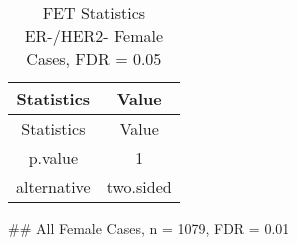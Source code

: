 \documentclass[]{article}
\begin{document}
\begin{longtable}[]{@{}cc@{}}
\caption{FET Statistics ER-/HER2- Female Cases, FDR =
0.05}\tabularnewline
\toprule
\begin{minipage}[b]{0.18\columnwidth}\centering\strut
Statistics\strut
\end{minipage} & \begin{minipage}[b]{0.14\columnwidth}\centering\strut
Value\strut
\end{minipage}\tabularnewline
\midrule
\endfirsthead
\toprule
\begin{minipage}[b]{0.18\columnwidth}\centering\strut
Statistics\strut
\end{minipage} & \begin{minipage}[b]{0.14\columnwidth}\centering\strut
Value\strut
\end{minipage}\tabularnewline
\midrule
\endhead
\begin{minipage}[t]{0.18\columnwidth}\centering\strut
p.value\strut
\end{minipage} & \begin{minipage}[t]{0.14\columnwidth}\centering\strut
1\strut
\end{minipage}\tabularnewline
\begin{minipage}[t]{0.18\columnwidth}\centering\strut
alternative\strut
\end{minipage} & \begin{minipage}[t]{0.14\columnwidth}\centering\strut
two.sided\strut
\end{minipage}\tabularnewline
\bottomrule
\end{longtable}

\pagebreak
\#\# All Female Cases, n = 1079, FDR = 0.01
\end{document}
